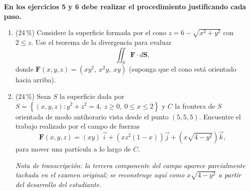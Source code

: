 \documentclass[11pt]{article}
\begin{document}
\vspace{4pt}
\noindent\textbf{En los ejercicios 5 y 6 debe realizar el procedimiento justificando cada paso.}

\begin{enumerate}[start=5]
\item{} (24\,\%) Considere la superficie formada por el cono $z = 6 - \sqrt{x^2+y^2}$ con $2 \leq z$. Use el teorema de la divergencia para evaluar
\[
\iint_S \mathbf F \cdot d\mathbf S,
\]
donde $\mathbf F(x,y,z) = (xy^2,\ x^2y,\ xy)$ (suponga que el cono está orientado hacia arriba).

\item{} (24\,\%) Sean $S$ la superficie dada por $S = \left\{(x,y,z) : y^2 + z^2 = 4,\ z \geq 0,\ 0 \leq x \leq 2\right\}$ y $C$ la frontera de $S$ orientada de modo antihorario vista desde el punto $(5,5,5)$. Encuentre el trabajo realizado por el campo de fuerzas
\[
\mathbf F(x,y,z) = (xy)\,\vec i + \left(xz^2(1-x)\right)\vec j + \left(x\sqrt{4-y^2}\right)\vec k,
\]
para mover una partícula a lo largo de $C$.

\vspace{2pt}
\noindent\footnotesize\textit{Nota de transcripción: la tercera componente del campo aparece parcialmente tachada en el examen original; se reconstruye aquí como $x\sqrt{4-y^2}$ a partir del desarrollo del estudiante.}\normalsize
\end{enumerate}

\examfooter
\end{document}
